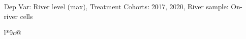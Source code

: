 \begin{table}[H]
\captionlistentry[table]{}
\label{table:beaver_hydrometry_DVlevel_max_SCg23}
\tiny %
Dep Var: River level (max), Treatment Cohorts: 2017, 2020, River sample: On-river cells \\
\begin{threeparttable}
\begin{tabulary}{\textwidth}{l*{9}{c}@{}}
\toprule \toprule
\noalign{\smallskip}
\noalign{\smallskip}
\midrule \bottomrule
\end{tabulary}
\medskip
\end{threeparttable}
\end{table}
